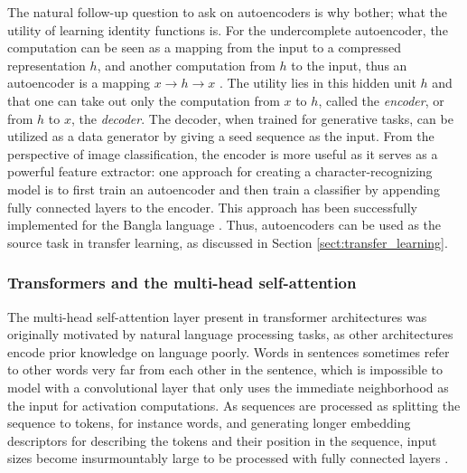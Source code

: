 \documentclass{article}
\begin{document}
The natural follow-up question to ask on autoencoders is why bother; what the utility 
of learning identity functions is. For the undercomplete autoencoder, the computation 
can be seen as a mapping from the input to a compressed representation $h$, and 
another computation from $h$ to the input, thus an autoencoder is a mapping $x\to h\to x$ \cite{goodfellow}.
The utility lies in this hidden unit $h$ and that one can take out only the 
computation from $x$ to $h$, called the \textit{encoder}, or from $h$ to $x$, the \textit{decoder}.
The decoder, when trained for generative tasks, can be utilized as a data generator by giving a seed 
sequence as the input.
From the perspective of image classification, the encoder is more useful as it serves 
as a powerful feature extractor: one approach for creating a character-recognizing model 
is to first train an autoencoder and then train a classifier by appending 
fully connected layers to the encoder. This approach has been successfully implemented for the Bangla language \cite{6shoponBangla}.
Thus, autoencoders can be used as the source 
task in transfer learning, as discussed in Section \ref{sect:transfer_learning}.

\subsubsection{Transformers and the multi-head self-attention}

The multi-head self-attention layer present in transformer architectures was
originally motivated by natural language processing tasks, as other architectures
encode prior knowledge on language poorly. Words in sentences sometimes refer to 
other words very far from each other in the sentence, which is impossible to model with a 
convolutional layer that only uses the immediate neighborhood as the input for activation computations.
As sequences are processed as splitting the sequence to tokens, for instance words, and generating 
longer embedding descriptors for describing the tokens and their position in the sequence, input sizes become insurmountably large 
to be processed with fully connected layers \cite{princebook}.
\end{document}
